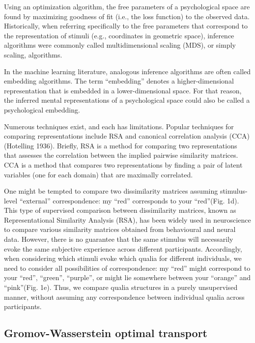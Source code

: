 \documentclass[
  authoryear]{elsarticle}
\begin{document}
Using an optimization algorithm, the free parameters of a psychological
space are found by maximizing goodness of fit (i.e., the loss function)
to the observed data. Historically, when referring specifically to the
free parameters that correspond to the representation of stimuli (e.g.,
coordinates in geometric space), inference algorithms were commonly
called multidimensional scaling (MDS), or simply scaling, algorithms.

In the machine learning literature, analogous inference algorithms are
often called embedding algorithms. The term ``embedding'' denotes a
higher-dimensional representation that is embedded in a
lower-dimensional space. For that reason, the inferred mental
representations of a psychological space could also be called a
psychological embedding.

Numerous techniques exist, and each has limitations. Popular techniques
for comparing representations include RSA \citet{kriegeskorte2008} and
canonical correlation analysis (CCA) (Hotelling 1936). Briefly, RSA is a
method for comparing two representations that assesses the correlation
between the implied pairwise similarity matrices. CCA is a method that
compares two representations by finding a pair of latent variables (one
for each domain) that are maximally correlated.

One might be tempted to compare two dissimilarity matrices assuming
stimulus-level ``external'' correspondence: my ``red'' corresponds to
your ``red''(Fig. 1d). This type of supervised comparison between
dissimilarity matrices, known as Representational Similarity Analysis
(RSA), has been widely used in neuroscience to compare various
similarity matrices obtained from behavioural and neural data. However,
there is no guarantee that the same stimulus will necessarily evoke the
same subjective experience across different participants. Accordingly,
when considering which stimuli evoke which qualia for different
individuals, we need to consider all possibilities of correspondence: my
``red'' might correspond to your ``red'', ``green'', ``purple'', or
might lie somewhere between your ``orange'' and ``pink''(Fig. 1e). Thus,
we compare qualia structures in a purely unsupervised manner, without
assuming any correspondence between individual qualia across
participants.

\subsection{Gromov-Wasserstein optimal
transport}\label{gromov-wasserstein-optimal-transport}
\end{document}
